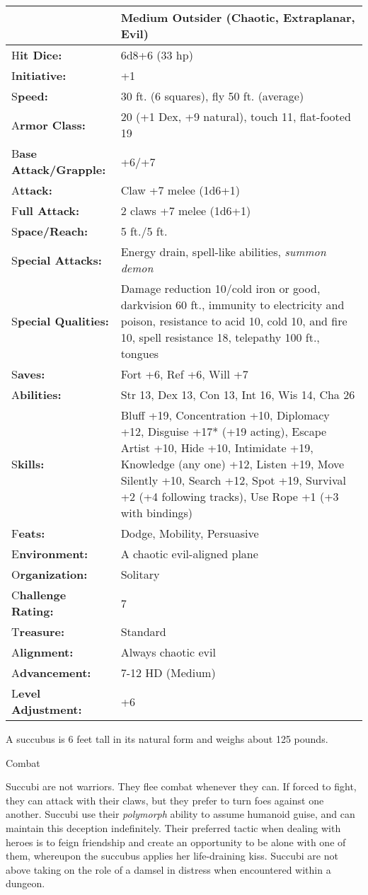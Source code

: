 \documentclass{article}
\begin{document}
\begin{tabular}{|>{\raggedright}p{91pt}|>{\raggedright}p{215pt}|}
\hline
  & Medium Outsider (Chaotic, Extraplanar, Evil)\tabularnewline
\hline
H\textbf{it Dice:} & 6d8+6 (33 hp)\tabularnewline
\hline
I\textbf{nitiative:} & +1\tabularnewline
\hline
S\textbf{peed:} & 30 ft. (6 squares), fly 50 ft. (average)\tabularnewline
\hline
A\textbf{rmor Class:} & 20 (+1 Dex, +9 natural), touch 11, flat-footed 19\tabularnewline
\hline
B\textbf{ase Attack/Grapple:} & +6/+7\tabularnewline
\hline
A\textbf{ttack:} & Claw +7 melee (1d6+1)\tabularnewline
\hline
F\textbf{ull Attack:} & 2 claws +7 melee (1d6+1)\tabularnewline
\hline
S\textbf{pace/Reach:} & 5 ft./5 ft.\tabularnewline
\hline
S\textbf{pecial Attacks:} & Energy drain, spell-like abilities, \textit{summon 
demon}\tabularnewline
\hline
S\textbf{pecial Qualities:} & Damage reduction 10/cold iron or good, darkvision 
60 ft., immunity to electricity and poison, resistance to acid 10, cold 10, and 
fire 10, spell resistance 18, telepathy 100 ft., tongues\tabularnewline
\hline
S\textbf{aves:} & Fort +6, Ref +6, Will +7\tabularnewline
\hline
A\textbf{bilities:} & Str 13, Dex 13, Con 13, Int 16, Wis 14, Cha 26\tabularnewline
\hline
S\textbf{kills:} & Bluff +19, Concentration +10, Diplomacy +12, Disguise +17* (+19 
acting), Escape Artist +10, Hide +10, Intimidate +19, Knowledge (any one) +12, 
Listen +19, Move Silently +10, Search +12, Spot +19, Survival +2 (+4 following 
tracks), Use Rope +1 (+3 with bindings)\tabularnewline
\hline
F\textbf{eats:} & Dodge, Mobility, Persuasive\tabularnewline
\hline
E\textbf{nvironment:} & A chaotic evil-aligned plane\tabularnewline
\hline
O\textbf{rganization:} & Solitary\tabularnewline
\hline
C\textbf{hallenge Rating:} & 7\tabularnewline
\hline
T\textbf{reasure:} & Standard\tabularnewline
\hline
A\textbf{lignment:} & Always chaotic evil\tabularnewline
\hline
A\textbf{dvancement:} & 7-12 HD (Medium)\tabularnewline
\hline
L\textbf{evel Adjustment:} & +6\tabularnewline
\hline
\end{tabular}

A succubus is 6 feet tall in its natural form and weighs about 125 pounds.

Combat

Succubi are not warriors. They flee combat whenever they can. If forced to fight, 
they can attack with their claws, but they prefer to turn foes against one another. 
Succubi use their \textit{polymorph }ability to assume humanoid guise, and can 
maintain this deception indefinitely. Their preferred tactic when dealing with 
heroes is to feign friendship and create an opportunity to be alone with one of 
them, whereupon the succubus applies her life-draining kiss. Succubi are not above 
taking on the role of a damsel in distress when encountered within a dungeon.
\end{document}
